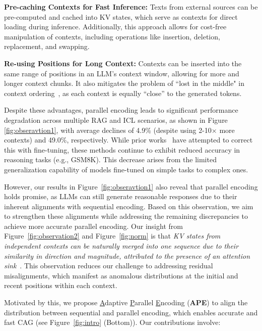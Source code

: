 \textbf{Pre-caching Contexts for Fast Inference:} Texts from external sources can be pre-computed and cached into KV states, which serve as contexts for direct loading during inference. Additionally, this approach allows for cost-free manipulation of contexts, including operations like insertion, deletion, replacement, and swapping.

\textbf{Re-using Positions for Long Context:} Contexts can be inserted into the same range of positions in an LLM's context window, allowing for more and longer context chunks. It also mitigates the problem of ``lost in the middle" in context ordering~\citep{liu2024lost}, as each context is equally ``close'' to the generated tokens. 



Despite these advantages, parallel encoding leads to significant performance degradation across multiple RAG and ICL scenarios, as shown in Figure \ref{fig:obseravtion1}, with average declines of 4.9\% (despite using 2-10$\times$ more contexts) and 49.0\%, respectively. While prior works~\citep{Sun2024BlockAttentionFE, yen2024long} have attempted to correct this with fine-tuning, these methods continue to exhibit reduced accuracy in reasoning tasks (e.g., GSM8K). This decrease arises from the limited generalization capability of models fine-tuned on simple tasks to complex ones.

However, our results in Figure~\ref{fig:obseravtion1} also reveal that parallel encoding holds promise, as LLMs can still generate reasonable responses due to their inherent alignments with sequential encoding. Based on this observation, we aim to strengthen these alignments while addressing the remaining discrepancies to achieve more accurate parallel encoding. Our insight from Figure~\ref{fig:observation2} and Figure~\ref{fig:norm} is that \textit{KV states from independent contexts can be naturally merged into one sequence due to their similarity in direction and magnitude, attributed to the presence of an attention sink}~\citep{xiao2023efficient}. This observation reduces our challenge to addressing residual misalignments, which manifest as anomalous distributions at the initial and recent positions within each context.

Motivated by this, we propose \underline{A}daptive \underline{P}arallel \underline{E}ncoding (\textbf{APE}) to align the distribution between sequential and parallel encoding, which enables accurate and fast CAG (see Figure~\ref{fig:intro} (Bottom)). Our contributions involve:

